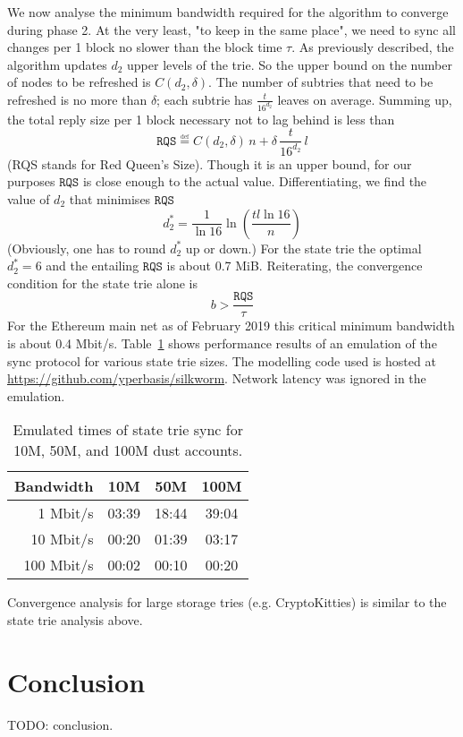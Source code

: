 \documentclass{amsart}
\begin{document}
We now analyse the minimum bandwidth required for the algorithm to converge during phase 2.
At the very least, "to keep in the same place",
we need to sync all changes per 1 block no slower than the block time $\tau$.
As previously described, the algorithm updates $d_2$ upper levels of the trie.
So the upper bound on the number of nodes to be refreshed is $C(d_2, \delta)$.
The number of subtries that need to be refreshed is no more than $\delta$;
each subtrie has $\frac{t}{16^{d_2}}$ leaves on average.
Summing up, the total reply size per 1 block necessary not to lag behind is less than
\begin{equation}
    \texttt{RQS} \overset{\underset{\mathrm{def}}{}}{=}
    C(d_2, \delta) \, n + \delta \, \frac{t}{16^{d_2}} \, l
\end{equation}
(RQS stands for Red Queen's Size).
Though it is an upper bound, for our purposes $\texttt{RQS}$ is close enough to the actual value.
Differentiating, we find the value of $d_2$ that minimises $\texttt{RQS}$
\begin{equation}
    d_2^* = \frac{1}{\ln 16} \ln \left( \frac{tl \ln16}{n} \right)
\end{equation}
(Obviously, one has to round $d_2^*$ up or down.)
For the state trie the optimal $d_2^* = 6$ and the entailing $\texttt{RQS}$ is about 0.7 MiB.
Reiterating, the convergence condition for the state trie alone is
\begin{equation}
    b > \frac{\texttt{RQS}}{\tau}
\end{equation}
For the Ethereum main net as of February 2019 this critical minimum bandwidth is about 0.4 Mbit/s.
Table~\ref{tab:emulated_time} shows performance results of an emulation of the sync protocol for various state trie sizes.
The modelling code used is hosted at
\href{https://github.com/yperbasis/silkworm/blob/master/lab/sync_emulator.cpp}{https://github.com/yperbasis/silkworm}.
Network latency was ignored in the emulation.

\begin{table}[h]
\begin{tabular}{ r | c c c }
    Bandwidth & 10M & 50M & 100M \\
    \hline
      1 Mbit/s & 03:39 & 18:44 & 39:04 \\
     10 Mbit/s & 00:20 & 01:39 & 03:17 \\
    100 Mbit/s & 00:02 & 00:10 & 00:20 \\
\end{tabular}
\caption{Emulated times of state trie sync for 10M, 50M, and 100M dust accounts.}
\label{tab:emulated_time}
\end{table}

Convergence analysis for large storage tries (e.g. CryptoKitties) is similar to the state trie analysis above.

\section{Conclusion}

TODO: conclusion.



\end{document}
